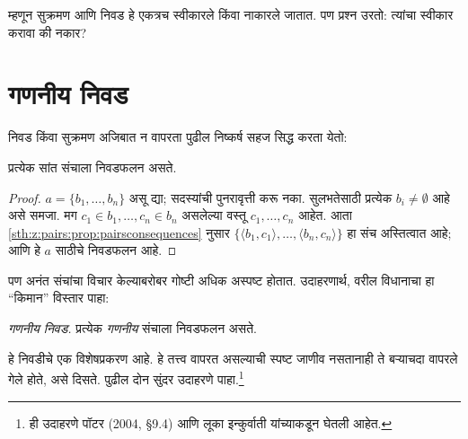 म्हणून सुक्रमण आणि निवड हे एकत्रच स्वीकारले किंवा नाकारले जातात. पण प्रश्न उरतो: त्यांचा स्वीकार करावा की नकार?








\section{गणनीय निवड}\label{sth:choice:countablechoice:sec}

निवड किंवा सुक्रमण अजिबात न वापरता पुढील निष्कर्ष सहज सिद्ध करता येतो:

\begin{lem}[$\Zminus$ मध्ये]
प्रत्येक सांत संचाला निवडफलन असते.
\end{lem}

\begin{proof}
$a = \{b_1, \ldots, b_n\}$ असू द्या; सदस्यांची पुनरावृत्ती करू नका. सुलभतेसाठी प्रत्येक $b_i
\neq \emptyset$ आहे असे समजा. मग $c_1 \in b_1, \ldots, c_n \in b_n$ असलेल्या वस्तू $c_1, \ldots, c_n$ आहेत. आता \ref{sth:z:pairs:prop:pairsconsequences} नुसार $\{\langle b_1,
c_1\rangle , \ldots, \langle b_n, c_n\rangle\}$ हा संच अस्तित्वात आहे; आणि हे $a$ साठीचे निवडफलन आहे.
\end{proof}

पण अनंत संचांचा विचार केल्याबरोबर गोष्टी अधिक अस्पष्ट होतात. उदाहरणार्थ, वरील विधानाचा हा “किमान” विस्तार पाहा:

\begin{defish}
\emph{गणनीय निवड.} प्रत्येक \emph{गणनीय} संचाला निवडफलन असते.
\end{defish}

हे निवडीचे एक विशेषप्रकरण आहे. हे तत्त्व वापरत असल्याची स्पष्ट जाणीव नसतानाही ते बऱ्याचदा वापरले गेले होते, असे दिसते. पुढील दोन सुंदर उदाहरणे पाहा.\footnote{ही उदाहरणे पॉटर (2004, \S9.4) आणि लूका इन्कुर्वाती यांच्याकडून घेतली आहेत.}

